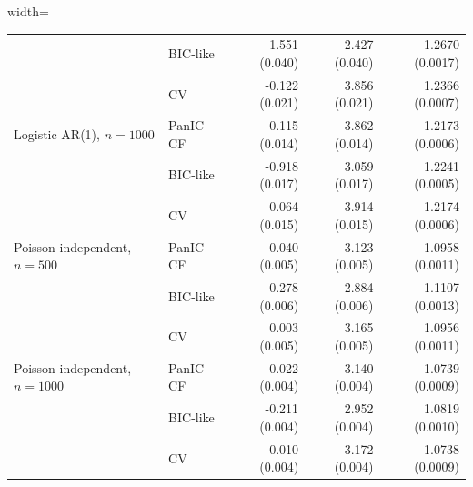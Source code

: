 \begin{table}[H]
\begin{adjustbox}{width=\textwidth}
\begin{tabular}{llrrr}
 & BIC-like & -1.551 (0.040) & 2.427 (0.040) & 1.2670 (0.0017) \\
 & CV & -0.122 (0.021) & 3.856 (0.021) & 1.2366 (0.0007) \\
Logistic AR(1), $n=1000$ & PanIC-CF & -0.115 (0.014) & 3.862 (0.014) & 1.2173 (0.0006) \\
 & BIC-like & -0.918 (0.017) & 3.059 (0.017) & 1.2241 (0.0005) \\
 & CV & -0.064 (0.015) & 3.914 (0.015) & 1.2174 (0.0006) \\
Poisson independent, $n=500$ & PanIC-CF & -0.040 (0.005) & 3.123 (0.005) & 1.0958 (0.0011) \\
 & BIC-like & -0.278 (0.006) & 2.884 (0.006) & 1.1107 (0.0013) \\
 & CV & 0.003 (0.005) & 3.165 (0.005) & 1.0956 (0.0011) \\
Poisson independent, $n=1000$ & PanIC-CF & -0.022 (0.004) & 3.140 (0.004) & 1.0739 (0.0009) \\
 & BIC-like & -0.211 (0.004) & 2.952 (0.004) & 1.0819 (0.0010) \\
 & CV & 0.010 (0.004) & 3.172 (0.004) & 1.0738 (0.0009) \\
\hline
\end{tabular}
\end{adjustbox}
\end{table}
